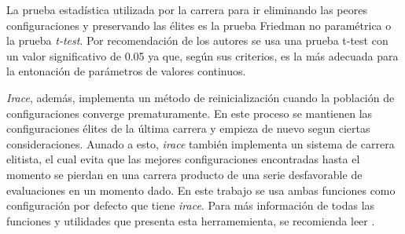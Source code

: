 

La prueba estadística utilizada por la carrera para ir eliminando las peores configuraciones y preservando las élites es la prueba Friedman no paramétrica o la prueba \emph{t-test}. Por recomendación de los autores se usa una prueba t-test con un valor significativo de 0.05 ya que, según sus criterios, es la más adecuada para la entonación de parámetros de valores continuos.

\emph{Irace}, además, implementa un método de reinicialización cuando la población de configuraciones converge prematuramente. En este proceso se mantienen las configuraciones élites de la última carrera y empieza de nuevo segun ciertas consideraciones. Aunado a esto, \emph{irace} también implementa un sistema de carrera elitista, el cual evita que las mejores configuraciones encontradas hasta el momento se pierdan en una carrera producto de una serie desfavorable de evaluaciones en un momento dado. En este trabajo se usa ambas funciones como configuración por defecto que tiene \emph{irace}. Para más información de todas las funciones y utilidades que presenta esta herramemienta, se recomienda leer \cite{lopez2016irace}.
